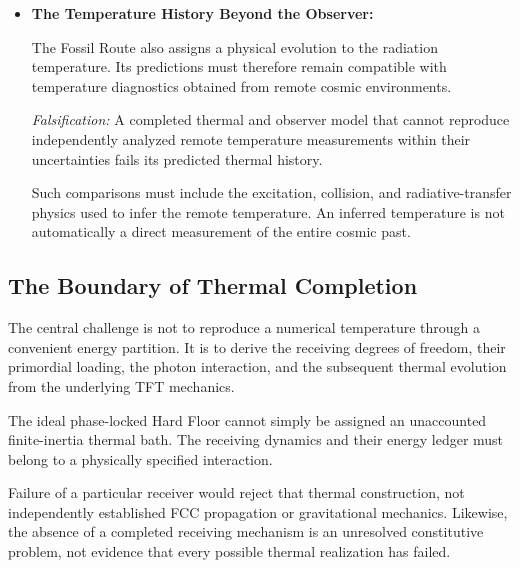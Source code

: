 \begin{itemize}
\textit{Falsification:} If the calculated thermal
rates cannot establish the required spectrum during
the assigned epoch, or if subsequent interactions
produce excessive opacity, scattering, spectral
diffusion, polarization changes, or secondary radiation,
the proposed thermal history is contradicted.

A fossil radiation population need not remain in
active thermal equilibrium indefinitely. The
essential requirement is that equilibration occurs
when the proposed cosmic history requires it.

\item \textbf{The Temperature History Beyond the Observer:}

The Fossil Route also assigns a physical evolution
to the radiation temperature. Its predictions must
therefore remain compatible with temperature
diagnostics obtained from remote cosmic environments.

\textit{Falsification:} A completed thermal and
observer model that cannot reproduce independently
analyzed remote temperature measurements within
their uncertainties fails its predicted thermal
history.

Such comparisons must include the excitation,
collision, and radiative-transfer physics used
to infer the remote temperature. An inferred
temperature is not automatically a direct
measurement of the entire cosmic past.

\end{itemize}

\subsection*{The Boundary of Thermal Completion}

The central challenge is not to reproduce a numerical
temperature through a convenient energy partition.
It is to derive the receiving degrees of freedom,
their primordial loading, the photon interaction,
and the subsequent thermal evolution from the
underlying TFT mechanics.

The ideal phase-locked Hard Floor cannot simply be
assigned an unaccounted finite-inertia thermal bath.
The receiving dynamics and their energy ledger must
belong to a physically specified interaction.

Failure of a particular receiver would reject that
thermal construction, not independently established
FCC propagation or gravitational mechanics. Likewise,
the absence of a completed receiving mechanism is
an unresolved constitutive problem, not evidence
that every possible thermal realization has failed.

